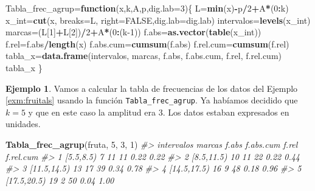 \documentclass[
]{book}
\newenvironment{Shaded}{\begin{snugshade}}{\end{snugshade}}
\newcommand{\CommentTok}[1]{\textcolor[rgb]{0.56,0.35,0.01}{\textit{#1}}}
\newcommand{\ControlFlowTok}[1]{\textcolor[rgb]{0.13,0.29,0.53}{\textbf{#1}}}
\newcommand{\DataTypeTok}[1]{\textcolor[rgb]{0.13,0.29,0.53}{#1}}
\newcommand{\DecValTok}[1]{\textcolor[rgb]{0.00,0.00,0.81}{#1}}
\newcommand{\KeywordTok}[1]{\textcolor[rgb]{0.13,0.29,0.53}{\textbf{#1}}}
\newcommand{\NormalTok}[1]{#1}
\newcommand{\OperatorTok}[1]{\textcolor[rgb]{0.81,0.36,0.00}{\textbf{#1}}}
\newcommand{\OtherTok}[1]{\textcolor[rgb]{0.56,0.35,0.01}{#1}}
\theoremstyle{definition}
\theoremstyle{definition}
\newtheorem{example}{Ejemplo}[chapter]
\theoremstyle{definition}
\theoremstyle{remark}
\begin{document}
\begin{Shaded}
\begin{Highlighting}[]
\NormalTok{Tabla\_frec\_agrup=}\ControlFlowTok{function}\NormalTok{(x,k,A,p,}\DataTypeTok{dig.lab=}\DecValTok{3}\NormalTok{)\{}
\NormalTok{    L=}\KeywordTok{min}\NormalTok{(x)}\OperatorTok{{-}}\NormalTok{p}\OperatorTok{/}\DecValTok{2}\OperatorTok{+}\NormalTok{A}\OperatorTok{*}\NormalTok{(}\DecValTok{0}\OperatorTok{:}\NormalTok{k)}
\NormalTok{    x\_int=}\KeywordTok{cut}\NormalTok{(x, }\DataTypeTok{breaks=}\NormalTok{L, }\DataTypeTok{right=}\OtherTok{FALSE}\NormalTok{,}\DataTypeTok{dig.lab=}\NormalTok{dig.lab)}
\NormalTok{    intervalos=}\KeywordTok{levels}\NormalTok{(x\_int)}
\NormalTok{    marcas=(L[}\DecValTok{1}\NormalTok{]}\OperatorTok{+}\NormalTok{L[}\DecValTok{2}\NormalTok{])}\OperatorTok{/}\DecValTok{2}\OperatorTok{+}\NormalTok{A}\OperatorTok{*}\NormalTok{(}\DecValTok{0}\OperatorTok{:}\NormalTok{(k}\DecValTok{{-}1}\NormalTok{))}
\NormalTok{    f.abs=}\KeywordTok{as.vector}\NormalTok{(}\KeywordTok{table}\NormalTok{(x\_int))}
\NormalTok{    f.rel=f.abs}\OperatorTok{/}\KeywordTok{length}\NormalTok{(x)}
\NormalTok{    f.abs.cum=}\KeywordTok{cumsum}\NormalTok{(f.abs)}
\NormalTok{    f.rel.cum=}\KeywordTok{cumsum}\NormalTok{(f.rel)}
\NormalTok{    tabla\_x=}\KeywordTok{data.frame}\NormalTok{(intervalos, marcas, f.abs, f.abs.cum, f.rel, f.rel.cum)}
\NormalTok{    tabla\_x}
\NormalTok{  \}}
\end{Highlighting}
\end{Shaded}

\begin{example}
\protect\hypertarget{exm:unnamed-chunk-53}{}{\label{exm:unnamed-chunk-53} }Vamos a calcular la tabla de frecuencias de los datos del Ejemplo \ref{exm:fruitals} usando la función \texttt{Tabla\_frec\_agrup}. Ya habíamos decidido que \(k=5\) y que en este caso la amplitud era 3. Los datos estaban expresados en unidades.
\end{example}

\begin{Shaded}
\begin{Highlighting}[]
\KeywordTok{Tabla\_frec\_agrup}\NormalTok{(fruta, }\DecValTok{5}\NormalTok{, }\DecValTok{3}\NormalTok{, }\DecValTok{1}\NormalTok{)}
\CommentTok{\#\textgreater{}    intervalos marcas f.abs f.abs.cum f.rel f.rel.cum}
\CommentTok{\#\textgreater{} 1   [5.5,8.5)      7    11        11  0.22      0.22}
\CommentTok{\#\textgreater{} 2  [8.5,11.5)     10    11        22  0.22      0.44}
\CommentTok{\#\textgreater{} 3 [11.5,14.5)     13    17        39  0.34      0.78}
\CommentTok{\#\textgreater{} 4 [14.5,17.5)     16     9        48  0.18      0.96}
\CommentTok{\#\textgreater{} 5 [17.5,20.5)     19     2        50  0.04      1.00}
\end{Highlighting}
\end{Shaded}
\end{document}
